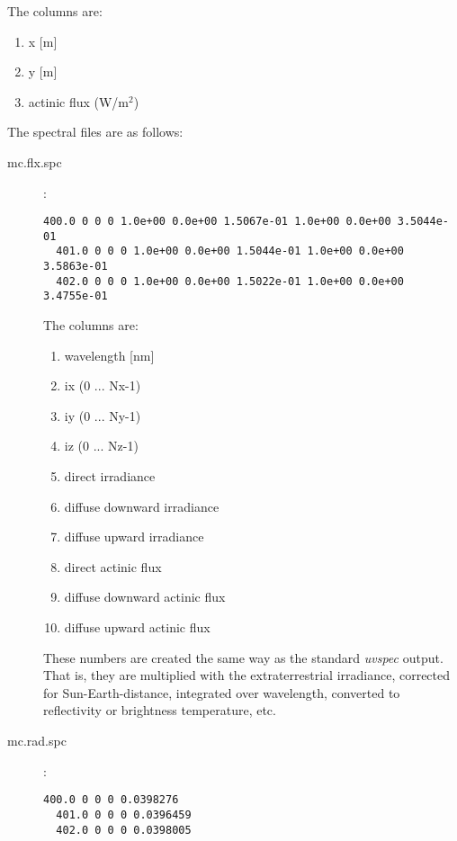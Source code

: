 \begin{description}
  The columns are:
  \begin{enumerate}
  \item  x [m]
  \item  y [m]
  \item  actinic flux (W/m$^2$)
  \end{enumerate}

\end{description}  

The spectral files are as follows:
\begin{description}
 \item[mc.flx.spc]
   :
  \begin{Verbatim}[fontsize=\footnotesize, frame=single, samepage=true]
  400.0 0 0 0 1.0e+00 0.0e+00 1.5067e-01 1.0e+00 0.0e+00 3.5044e-01
  401.0 0 0 0 1.0e+00 0.0e+00 1.5044e-01 1.0e+00 0.0e+00 3.5863e-01
  402.0 0 0 0 1.0e+00 0.0e+00 1.5022e-01 1.0e+00 0.0e+00 3.4755e-01
  \end{Verbatim}

  The columns are:
  \begin{enumerate}
  \item  wavelength [nm]
  \item  ix (0 ... Nx-1)
  \item  iy (0 ... Ny-1)
  \item  iz (0 ... Nz-1)
  \item  direct irradiance
  \item  diffuse downward irradiance
  \item  diffuse upward irradiance
  \item  direct actinic flux
  \item  diffuse downward actinic flux
  \item  diffuse upward actinic flux
  \end{enumerate}
  These numbers are created the same way as the standard {\sl uvspec} output. That
  is, they are multiplied with the extraterrestrial irradiance, corrected for
  Sun-Earth-distance, integrated over wavelength, converted to reflectivity or 
  brightness temperature, etc. 

 \item[mc.rad.spc]
   :
  \begin{Verbatim}[fontsize=\footnotesize, frame=single, samepage=true]
  400.0 0 0 0 0.0398276
  401.0 0 0 0 0.0396459
  402.0 0 0 0 0.0398005
  \end{Verbatim}


\end{description}
